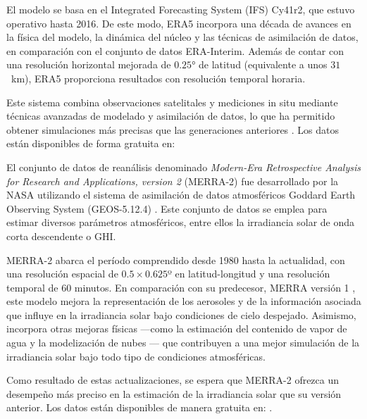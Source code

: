 \documentclass[letterpaper,12pt, twoside]{report}
\providecommand{\DIFdeltex}[1]{{\protect\color{red} \scriptsize #1}} %
\providecommand{\DIFdel}[1]{\texorpdfstring{\DIFdeltex{#1}}{}} %
\begin{document}
\DIFdel{El modelo se basa en el Integrated Forecasting System (IFS) Cy41r2, que estuvo operativo hasta 2016. De este modo, ERA5 incorpora una década de avances en la física del modelo, la dinámica del núcleo y las técnicas de asimilación de datos, en comparación con el conjunto de datos ERA-Interim. Además de contar con una resolución horizontal mejorada de $0.25$° de latitud (equivalente a unos $31$~km), ERA5 proporciona resultados con resolución temporal horaria. 
}%

\DIFdel{Este sistema combina observaciones satelitales y mediciones in situ mediante técnicas avanzadas de modelado y asimilación de datos, lo que ha permitido obtener simulaciones más precisas que las generaciones anteriores \citep{era, nogueira}. Los datos están disponibles de forma gratuita en: }%

\DIFdel{El conjunto de datos de reanálisis denominado \textit{Modern-Era Retrospective Analysis for Research and Applications, version 2} (MERRA-2) \citep{gelaro} fue desarrollado por la NASA utilizando el sistema de asimilación de datos atmosféricos Goddard Earth Observing System (GEOS-5.12.4) \citep{rienecker, molod}. Este conjunto de datos se emplea para estimar diversos parámetros atmosféricos, entre ellos la irradiancia solar de onda corta descendente o GHI. 
}%

\DIFdel{MERRA-2 abarca el período comprendido desde 1980 hasta la actualidad, con una resolución espacial de $0.5\times0.625$º en latitud-longitud y una resolución temporal de 60 minutos. En comparación con su predecesor, MERRA versión 1 \citep{rienecker2}, este modelo mejora la representación de los aerosoles y de la información asociada que influye en la irradiancia solar bajo condiciones de cielo despejado. Asimismo, incorpora otras mejoras físicas —como la estimación del contenido de vapor de agua y la modelización de nubes \citep{feng}— que contribuyen a una mejor simulación de la irradiancia solar bajo todo tipo de condiciones atmosféricas. 
}%

\DIFdel{Como resultado de estas actualizaciones, se espera que MERRA-2 ofrezca un desempeño más preciso en la estimación de la irradiancia solar que su versión anterior. Los datos están disponibles de manera gratuita en: }%
\DIFdel{.}%
\end{document}
